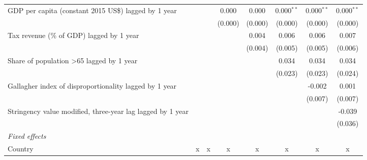 \begin{tabular}{lccccccc}
   GDP per capita (constant 2015 US\$) lagged by 1 year                                                     &              &              & 0.000        & 0.000        & 0.000$^{**}$ & 0.000$^{**}$ & 0.000$^{**}$\\   
                                                                                                            &              &              & (0.000)      & (0.000)      & (0.000)      & (0.000)      & (0.000)\\   
   Tax revenue (\% of GDP) lagged by 1 year                                                                 &              &              &              & 0.004        & 0.006        & 0.006        & 0.007\\   
                                                                                                            &              &              &              & (0.004)      & (0.005)      & (0.005)      & (0.006)\\   
   Share of population >65 lagged by 1 year                                                                 &              &              &              &              & 0.034        & 0.034        & 0.034\\   
                                                                                                            &              &              &              &              & (0.023)      & (0.023)      & (0.024)\\   
   Gallagher index of disproportionality lagged by 1 year                                                   &              &              &              &              &              & -0.002       & 0.001\\   
                                                                                                            &              &              &              &              &              & (0.007)      & (0.007)\\   
   Stringency value modified, three-year lag lagged by 1 year                                               &              &              &              &              &              &              & -0.039\\   
                                                                                                            &              &              &              &              &              &              & (0.036)\\   
   \emph{Fixed effects}\\
   Country                                                                                                  & x            & x            & x            & x            & x            & x            & x\\  

\end{tabular}
